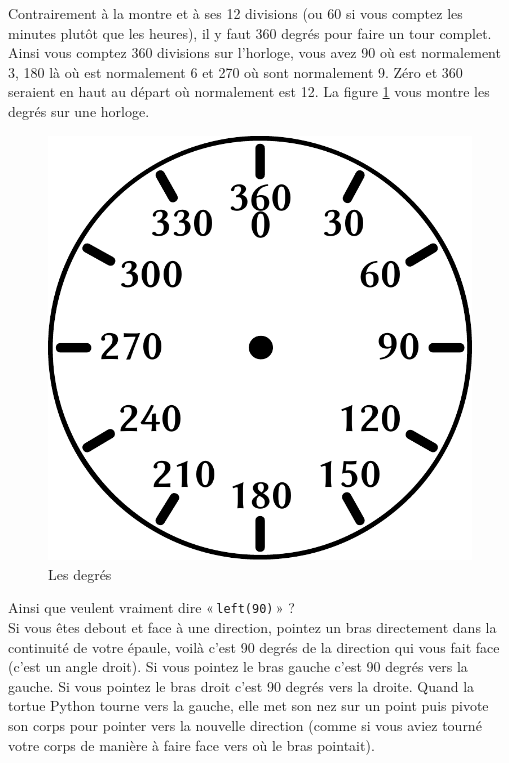 Contrairement à la montre et à ses 12 divisions (ou 60 si vous comptez les minutes plutôt que les heures), il y faut 360 degrés pour faire un tour complet. Ainsi vous comptez 360 divisions sur l'horloge, vous avez 90 où est normalement 3, 180 là où est normalement 6 et 270 où sont normalement 9. Zéro et 360 seraient en haut au départ où normalement est 12. La figure \ref{fig:degres} vous montre les degrés sur une horloge.
\begin{figure}[H]
\centering
\includegraphics[scale=0.5]{images/degres.pdf}
\caption{Les degrés}
\label{fig:degres}
\end{figure}

Ainsi que veulent vraiment dire « \texttt{left(90)} »  ?\\

Si vous êtes debout et face à une direction, pointez un bras directement dans la continuité de votre épaule, voilà c'est 90 degrés de la direction qui vous fait face (c'est un angle droit). Si vous pointez le bras gauche c'est 90 degrés vers la gauche. Si vous pointez le bras droit c'est 90 degrés vers la droite. Quand la tortue Python tourne vers la gauche, elle met son nez sur un point puis pivote son corps pour pointer vers la nouvelle direction (comme si vous aviez tourné votre corps de manière à faire face vers où le bras pointait).\\

